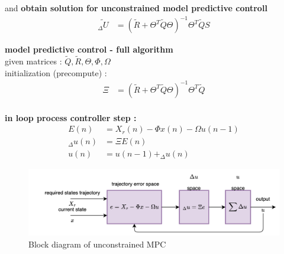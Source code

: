 \documentclass[12pt,twoside,onecolumn,openany,extrafontsizes,dvipsnames]{memoir}
\begin{document}
        and \textbf{obtain solution for unconstrained model predictive controll}
        \begin{align*}
          \tilde{_\Delta U} &= (\tilde{R} + \Theta^T\tilde{Q}\Theta)^{-1} \Theta^T\tilde{Q}S
        \end{align*} 

        \textbf{model predictive control - full algorithm} \\
        given matrices : $\tilde{Q}, \tilde{R}, \Theta, \Phi, \Omega$ \\
        initialization (precompute) :
        \begin{align*}
        \Xi &= (\tilde{R} + \Theta^T\tilde{Q}\Theta)^{-1} \Theta^T\tilde{Q} \\
        \end{align*}
        
        \textbf{in loop process controller step :}
        \begin{align*}
          E(n) &= X_r(n) - \Phi x(n) - \Omega u(n-1) \\
          _\Delta u(n) &= \Xi E(n) \\
          u(n) &= u(n-1) + _\Delta u(n)
        \end{align*}
        
        \begin{figure}[!htb]
            \centering
            \includegraphics[scale=0.8]{../diagrams/control/control-mpc.png}
            \caption{Block diagram of unconstrained MPC}
            \label{fig:mpc_block}
        \end{figure}
      
\end{document}
